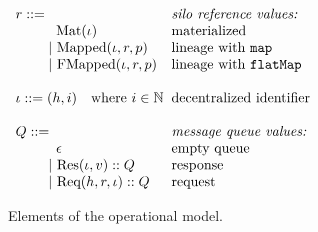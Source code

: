 \documentclass{article}
\theoremstyle{definition}
\newcommand{\gap}{\quad\quad}
\newcommand{\ba}{\begin{array}}
\newcommand{\ea}{\end{array}}
\newcommand{\Req}[3]{\text{Req}(#1, #2, #3)}
\newcommand{\Res}[2]{\text{Res}(#1, #2)}
\newcommand{\ReqF}[2]{\text{Req}_{\iota}(#1, #2)}
\newcommand{\ReqE}[3]{\text{Req}_f(#1, #2, #3)}
\begin{document}
\begin{figure}[ht!]
\centering

$\ba[t]{l@{\hspace{2mm}}l}
r ::=                                                  & \mbox{{\it{silo reference values:}}} \\
\gap \:\:\:\: \text{Mat}(\iota)                        & \mbox{materialized} \\    
\gap ~|~  \text{Mapped}(\iota, r, p)                   & \mbox{lineage with \texttt{map}} \\    
\gap ~|~  \text{FMapped}(\iota, r, p)                  & \mbox{lineage with \texttt{flatMap}} \\   
                                                       & \\   
\iota  ::= (h,i) \quad \text{where}~i \in \mathbb{N}   & \mbox{decentralized identifier} \\
                                                       & \\
Q      ::=                                             & \mbox{{\it{message queue values:}}} \\
\gap \:\:\:\: \epsilon                                 & \mbox{empty queue} \\
\gap ~|~    {\Res \iota v} :: Q                        & \mbox{response} \\
\gap ~|~    {\Req h r \iota} :: Q                      & \mbox{request}  \\
\ea$

\caption{Elements of the operational model.}
\label{fig:elems-opsem}

\end{figure}
\end{document}

